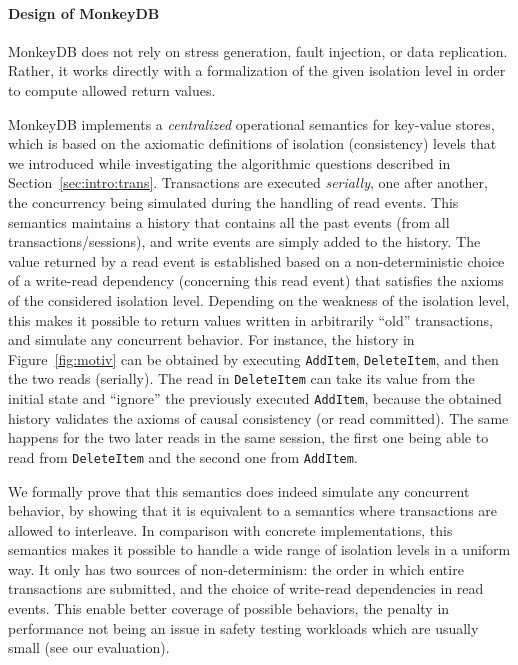 \paragraph{Design of MonkeyDB}
MonkeyDB does not rely on stress generation, fault
injection, or data replication. 
Rather, it works directly with a formalization of
the given isolation level in order to compute allowed return values. 

MonkeyDB implements a \emph{centralized} operational semantics for key-value stores, 
which is based on the axiomatic definitions of isolation (consistency)
levels that we introduced while investigating the algorithmic questions described in Section~\ref{sec:intro:trans}. 
Transactions are executed \emph{serially}, 
one after another, the concurrency being simulated during the handling of read events.  
This semantics maintains a history that contains all the past events (from all
transactions/sessions), and write events are simply added to the history. The
value returned by a read event is established based on a non-deterministic
choice of a write-read dependency (concerning this read event) that satisfies
the axioms of the considered isolation level.
Depending on the weakness of the isolation
level, this makes it possible to return values written in arbitrarily ``old''
transactions, and simulate any concurrent behavior. For instance, the history in Figure~\ref{fig:motiv}
can be obtained by executing \texttt{AddItem}, \texttt{DeleteItem}, and then the two reads (serially).
The read in \texttt{DeleteItem} can take its value from the initial state and ``ignore'' the
previously executed \texttt{AddItem}, because the obtained history validates the axioms of 
causal consistency (or read committed). The same happens for the two later reads in the same
session, the first one being able to read from \texttt{DeleteItem} and the second one
from \texttt{AddItem}.

We formally prove that this semantics does indeed simulate any concurrent behavior, by 
showing that it is equivalent to a semantics where transactions are allowed to interleave.
In comparison with concrete implementations, this semantics makes it possible to handle 
a wide range of isolation levels in a uniform way. It only has two sources of
non-determinism: 
the order in which entire transactions are submitted, and the choice of write-read dependencies in read 
events. This enable better coverage of possible behaviors, the penalty in performance not
being an issue in safety testing workloads which are usually small (see our evaluation). 


